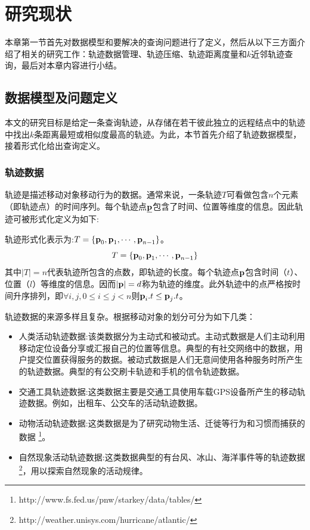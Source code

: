 \chapter{研究现状}\label{chapter:relatedwork}
本章第一节首先对数据模型和要解决的查询问题进行了定义，然后从以下三方面介绍了相关的研究工作：轨迹数据管理、轨迹压缩、轨迹距离度量和$k$近邻轨迹查询，最后对本章内容进行小结。

\section{数据模型及问题定义}\label{chapter-related-coll}
本文的研究目标是给定一条查询轨迹，从存储在若干彼此独立的远程结点中的轨迹中找出$k$条距离最短或相似度最高的轨迹。为此，本节首先介绍了轨迹数据模型，接着形式化给出查询定义。

\subsection{轨迹数据}
轨迹是描述移动对象移动行为的数据。通常来说，一条轨迹$T$可看做包含$n$个元素（即轨迹点）的时间序列。每个轨迹点$\emph{{\textbf{p}}}$包含了时间、位置等维度的信息。因此轨迹可被形式化定义为如下:
\begin{define}[轨迹(Trajectory)]
轨迹形式化表示为:$T=\{\textbf{p}_{0}, \textbf{p}_{1},\cdots, \textbf{p}_{n-1}\}$。
\begin{equation}
T=\{\textbf{p}_{0}, \textbf{p}_{1},\cdots, \textbf{p}_{n-1}\}
\end{equation}
其中$|T|=n$代表轨迹所包含的点数，即轨迹的长度。每个轨迹点$\textbf{p}$包含时间（$t$）、位置（$l$）等维度的信息。因而$|\textbf{p}|=d$称为轨迹的维度。此外轨迹中的点严格按时间升序排列，即$\forall i,j,0\le i\le j < n$则$\textbf{p}_{i}.t \le \textbf{p}_{j}.t$。
\end{define}

轨迹数据的来源多样且复杂。根据移动对象的划分可分为如下几类\cite{GQSurvery}：
\begin{itemize}
	\item \textsf{人类活动轨迹数据:}该类数据分为主动式和被动式。主动式数据是人们主动利用移动定位设备分享或汇报自己的位置等信息。典型的有社交网络中的数据，用户提交位置获得服务的数据。被动式数据是人们无意间使用各种服务时所产生的轨迹数据。典型的有公交刷卡轨迹\cite{WYL}和手机的信令轨迹数据\cite{zzgSF}。

	\item \textsf{交通工具轨迹数据:}这类数据主要是交通工具使用车载GPS设备所产生的移动轨迹数据。例如，出租车、公交车的活动轨迹数据\cite{DTKST}。
	
	\item \textsf{动物活动轨迹数据:}这类数据是为了研究动物生活、迁徙等行为和习惯而捕获的数据\cite{LeeHW07}
	\footnote{http://www.fs.fed.us/pnw/starkey/data/tables/}。
	
		\item \textsf{自然现象活动轨迹数据:}这类数据典型的有台风、冰山、海洋事件等的轨迹数据\footnote{http://weather.unisys.com/hurricane/atlantic/}，用以探索自然现象的活动规律。
\end{itemize}

